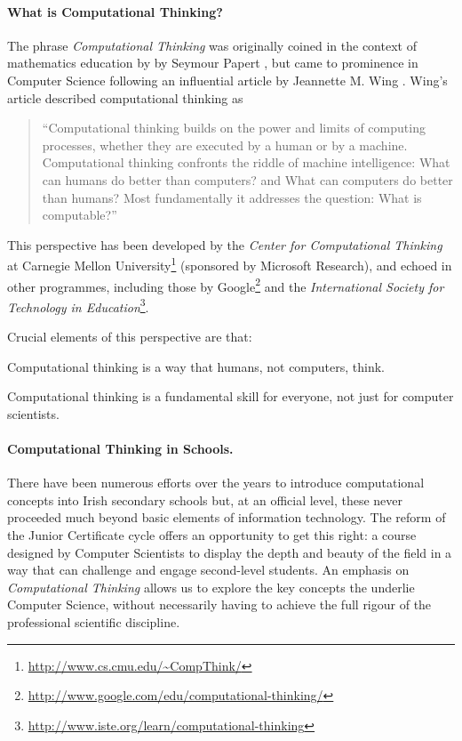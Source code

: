 \documentclass[a4paper]{article}
\begin{document}
\paragraph{What is Computational Thinking?}

The phrase \textit{Computational Thinking} was originally coined in the context of mathematics education by by Seymour Papert \cite{papert96}, but came to prominence in Computer Science following an influential article by Jeannette M. Wing \cite{wing-cacm06}.  Wing's article described computational thinking as
\begin{quotation}
``Computational thinking builds on the power and limits of computing processes, whether they are executed by a human or by a machine.  Computational thinking confronts the riddle of machine intelligence: What can humans do better than computers? and What can computers do better than humans? Most fundamentally it addresses the question: What is computable?''
\end{quotation}


This perspective has been developed by the 
\textit{Center for Computational Thinking} at Carnegie Mellon University\footnote{\url{http://www.cs.cmu.edu/~CompThink/}}
(sponsored by Microsoft Research), and echoed in other programmes, including those by 
Google\footnote{\url{http://www.google.com/edu/computational-thinking/}} and the
\textit{International Society for Technology in Education}\footnote{\url{http://www.iste.org/learn/computational-thinking}}.

Crucial elements of this perspective are that:
\begin{compactitem}
\item Computational thinking is a way that humans, not computers, think.
\item Computational thinking is a fundamental skill for
everyone, not just for computer scientists.
\end{compactitem}


\paragraph{Computational Thinking in Schools.} \label{par:CTSchools}

There have been numerous efforts over the years to introduce computational concepts into Irish secondary schools but, at an official level, these never proceeded much beyond basic elements of information technology.  The reform of the Junior Certificate cycle offers an opportunity to get this right: a course designed by Computer Scientists to display the depth and beauty of the field in a way that can challenge and engage second-level students.  An emphasis on 
\textit{Computational Thinking} allows us to explore the key concepts the underlie Computer Science, without necessarily having to achieve the full rigour of the professional scientific discipline.
\end{document}
